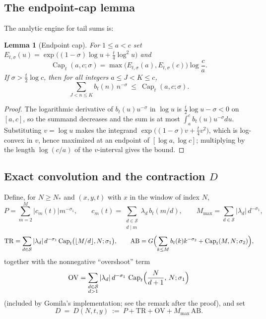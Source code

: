 \documentclass[11pt]{article}
\newtheorem{lemma}[theorem]{Lemma}
\theoremstyle{definition}
\newcommand{\calS}{\mathcal{S}}
\newcommand{\CapT}{\operatorname{Cap}}
\begin{document}
\subsection{The endpoint-cap lemma}

The analytic engine for tail sums is:

\begin{lemma}[Endpoint cap]\label{lem:cap}
For $1\le a<c$ set
$E_{t,\sigma}(u)=\exp\bigl((1-\sigma)\log u+\frac t4\log^2u\bigr)$ and
\[
\CapT_t(a,c;\sigma)=\max\bigl(E_{t,\sigma}(a),E_{t,\sigma}(c)\bigr)\log\frac ca .
\]
If $\sigma>\frac t2\log c$, then for all integers $a\le J<K\le c$,
\[
\sum_{J<n\le K}b_t(n)\,n^{-\sigma}\ \le\ \CapT_t(a,c;\sigma).
\]
\end{lemma}

\begin{proof}
The logarithmic derivative of $b_t(u)u^{-\sigma}$ in $\log u$ is
$\frac t2\log u-\sigma<0$ on $[a,c]$, so the summand decreases and the
sum is at most $\int_a^c b_t(u)u^{-\sigma}du$. Substituting
$v=\log u$ makes the integrand $\exp\bigl((1-\sigma)v+\frac t4v^2\bigr)$,
which is log-convex in $v$, hence maximized at an endpoint of
$[\log a,\log c]$; multiplying by the length $\log(c/a)$ of the
$v$-interval gives the bound.
\end{proof}

\subsection{Exact convolution and the contraction $D$}

Define, for $N\ge N_*$ and $(x,y,t)$ with $x$ in the window of index
$N$,
\[
P=\sum_{m=2}^{M}|c_m(t)|m^{-\sigma_1},
\qquad
c_m(t)=\sum_{\substack{d\in\calS\\ d\mid m}}\lambda_d\,b_t(m/d),
\qquad
M_{\max}=\sum_{d\in\calS}|\lambda_d|\,d^{-\sigma_1},
\]
\[
\mathrm{TR}=\sum_{d\in\calS}|\lambda_d|\,d^{-\sigma_1}
\CapT_t\bigl(\lfloor M/d\rfloor,N;\sigma_1\bigr),
\qquad
\mathrm{AB}=G\Bigl(\sum_{k\le M}b_t(k)k^{-\sigma_2}
+\CapT_t(M,N;\sigma_2)\Bigr),
\]
together with the nonnegative ``overshoot'' term
\[
\mathrm{OV}=\sum_{\substack{d\in\calS\\ d>1}}
|\lambda_d|\,d^{-\sigma_1}\,
\CapT_t\Bigl(\frac{N}{d+1},\,N;\sigma_1\Bigr)
\]
(included by Gomila's implementation; see the remark after the
proof), and set
\begin{equation}\label{eq:D}
D\ =\ D(N,t,y)\ :=\ P+\mathrm{TR}+\mathrm{OV}+M_{\max}\,\mathrm{AB}.
\end{equation}
\end{document}

